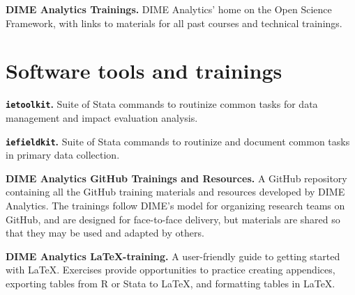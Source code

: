 \resourcepar\textbf{DIME Analytics Trainings.}
DIME Analytics' home on the Open Science Framework,
with links to materials for all past courses and technical trainings.


\section{Software tools and trainings}

\textbf{\texttt{ietoolkit}.}
Suite of Stata commands to routinize common tasks for
data management and impact evaluation analysis.

\resourcepar\textbf{\texttt{iefieldkit}.}
Suite of Stata commands to routinize 
and document common tasks in primary data collection.

\resourcepar\textbf{DIME Analytics GitHub Trainings and Resources.}
A GitHub repository containing all
the GitHub training materials and resources developed by DIME Analytics.
The trainings follow DIME's model for organizing research teams on GitHub,
and are designed for face-to-face delivery,
but materials are shared so that they may be used and adapted by others.

\resourcepar\textbf{DIME Analytics \LaTeX-training.}
A user-friendly guide to getting started with LaTeX.
Exercises provide opportunities to
practice creating appendices,
exporting tables from R or Stata to LaTeX,
and formatting tables in LaTeX.


\mainmatter
